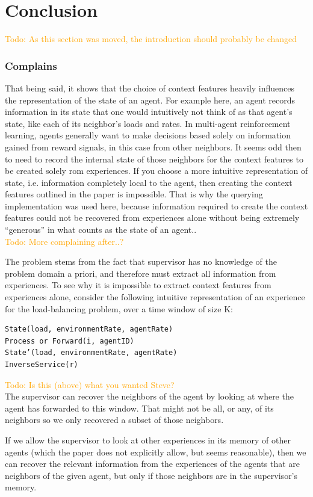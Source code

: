 \documentclass[letterpaper]{article}
\newcommand\todo[1]{\textcolor{orange}{Todo: #1}}
\begin{document}
\section{Conclusion}
\todo{As this section was moved, the introduction should probably be changed}
\subsubsection{Complains}
That being said, it shows that the choice of context features heavily influences the representation of the state of an agent.  For example here, an agent records information in its state that one would intuitively not think of as that agent’s state, like each of its neighbor’s loads and rates.  In multi-agent reinforcement learning, agents generally want to make decisions based solely on information gained from reward signals, in this case from other neighbors.  It seems odd then to need to record the internal state of those neighbors for the context features to be created solely rom experiences.  If you choose a more intuitive representation of state, i.e. information completely local to the agent, then creating the context features outlined in the paper is impossible. That is why the querying implementation was used here, because information required to create the context features could not be recovered from experiences alone without being extremely “generous” in what counts as the state of an agent..
\\\todo{More complaining after..?}

The problem stems from the fact that supervisor has no knowledge of the problem domain a priori, and therefore must extract all information from experiences. To see why it is impossible to extract context features from experiences alone, consider the following intuitive representation of an experience for the load-balancing problem, over a time window of size K:
\begin{lstlisting}
State(load, environmentRate, agentRate)
Process or Forward(i, agentID)
State’(load, environmentRate, agentRate)
InverseService(r)
\end{lstlisting}
\todo{Is this (above) what you wanted Steve?}\\
The supervisor can recover the neighbors of the agent by looking at where the agent has forwarded to this window.  That might not be all, or any, of its neighbors so we only recovered a subset of those neighbors.

If we allow the supervisor to look at other experiences in its memory of other agents (which the paper does not explicitly allow, but seems reasonable), then we can recover the relevant information from the experiences of the agents that are neighbors of the given agent, but only if those neighbors are in the supervisor’s memory.
\end{document}
